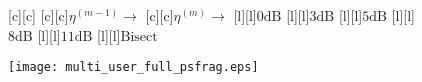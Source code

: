 \documentclass{article}
\begin{document}
\begin{figure}[htb]
  \begin{center}

        [c][c]{}
        [c][c]{$\eta^{(m-1)} \rightarrow$}
        [c][c]{$\eta^{(m)} \rightarrow$}
        [l][l]{$\mathrm{0dB}$}
        [l][l]{$\mathrm{3dB}$}
	[l]{$\mathrm{5dB}$}
	[l]{$\mathrm{8dB}$}
        [l][l]{$\mathrm{11dB}$}       
	[l]{$\mathrm{Bisect}$}

    \texttt{[image: multi\_user\_full\_psfrag.eps]}
    \end{center}
\end{figure}
\end{document}
